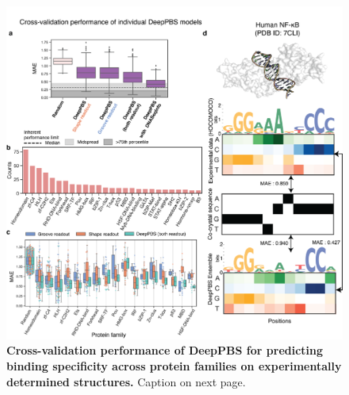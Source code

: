 \begin{center}
\begin{figure}[H]
  \includegraphics[width=\linewidth]{./pdnafigs/figS5.png}
    \caption[Cross-validation performance of DeepPBS for predicting binding specificity across protein families on
experimentally determined structures.]{\textbf{Cross-validation performance of DeepPBS for predicting binding specificity across protein families on experimentally determined structures.} Caption on next page.}
  \label{fig:pdnaS5}
\end{figure}
\addtocounter{figure}{-1}
\begin{figure} [H]

\end{figure}
\end{center}
